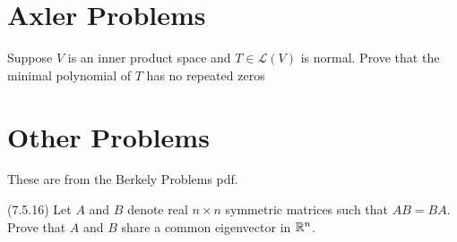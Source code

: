\documentclass[answers]{exam}
\renewcommand{\L}[1]{\mathcal{L}\left(#1\right)}
\begin{document}
\section{Axler Problems}
\begin{questions}
    \question Suppose $V$ is an inner product space and $T\in\L{V}$ is normal. Prove that the minimal polynomial
    of $T$ has no repeated zeros
\end{questions}

\section{Other Problems}
These are from the Berkely Problems pdf.
\begin{questions}
    \question (7.5.16) Let $A$ and $B$ denote real $n\times n$ symmetric matrices such that $AB=BA$.
    Prove that $A$ and $B$ share a common eigenvector in $\mathbb{R}^n$.
\end{questions}
\end{document}
